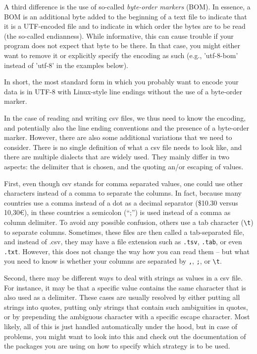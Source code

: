 A third difference is the use of so-called \emph{byte-order markers} (BOM). In essence, a BOM is an additional byte added to the beginning of a text file to indicate that it is a UTF-encoded file and to indicate in which order the bytes are to be read (the so-called endianness). While informative, this can cause trouble if your program does not expect that byte to be there. In that case, you might either want to remove it or explicitly specify the encoding as such (e.g., 'utf-8-bom' instead of 'utf-8' in the examples below).


In short, the most standard form in which you probably want to encode your data is in UTF-8 with Linux-style line endings without the use of a byte-order marker.


In the case of reading and writing csv files, we thus need to know the encoding, and potentially also the line ending conventions and the presence of a byte-order marker. However, there are also some additional variations that we need to consider. There is no single definition of what a csv file needs to look like, and there are multiple dialects that are widely used. They mainly differ in two aspects: the delimiter that is chosen, and the quoting an/or escaping of values.

First, even though csv stands for comma separated values, one could use other characters instead of a comma to separate the columns. In fact, because many countries use a comma instead of a dot  as a decimal separator (\$10.30 versus 10,30€), in these countries a semicolon (``;'') is used instead of a comma as  column delimiter. To avoid any possible confusion, others use a tab character (\texttt{\textbackslash t}) to separate columns. Sometimes, these files are then called a tab-separated file, and instead of .csv, they may have a file extension such as \texttt{\small{.tsv}}, \texttt{\small{.tab}}, or even \texttt{\small{.txt}}. However, this does not change the way how you can read them -- but what you need to know is whether your columns are separated by \texttt{,}, \texttt{;}, or \texttt{\textbackslash t}.

Second, there may be different ways  to deal with strings as values in a csv file. For instance, it may be that a specific value contains the same character that is also used as a delimiter. These cases are usually resolved by either putting all strings into quotes, putting only strings that contain such ambiguities in quotes, or by prepending the ambiguous character with a specific escape character. Most likely, all of this is just handled automatically under the hood, but in case of problems, you might want to look into this and check out the documentation of the packages you are using on how to specify which strategy is to be used.

